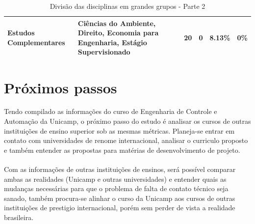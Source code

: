 \documentclass[12pt]{article} %
\begin{document}
\begin{table}[H]
{\begin{tabular}{|p{3cm}|p{7cm}|c|p{2cm}|p{2.5cm}|p{3cm}|}
Estudos Complementares        & {Ciências do Ambiente, Direito, Economia para Engenharia, Estágio Supervisionado}                                                                                                                                                                                                          & 20       & 0                 & 8.13\%               & 0\%                                 \\ \hline
\end{tabular}
}
\caption{Divisão das disciplinas em grandes grupos - Parte 2}
\label{div2}
\end{table}




\section{Próximos passos}

\paragraph{} Tendo compilado as informações do curso de Engenharia de Controle e Automação da Unicamp, o próximo passo do estudo é analisar os cursos de outras instituições de ensino superior sob as mesmas métricas. Planeja-se entrar em contato com universidades de renome internacional, analisar o curriculo proposto e também entender as propostas para matérias de desenvolvimento de projeto.

\paragraph{} Com as informações de outras instituições de ensinos, será possível comparar ambas as realidades (Unicamp e outras universidades) e entender quais as mudanças necessárias para que o problema de falta de contato técnico seja sanado, também procura-se alinhar o curso da Unicamp aos cursos de outras instituições de prestigio internacional, porém sem perder de vista a realidade brasileira.



 
\end{document}

